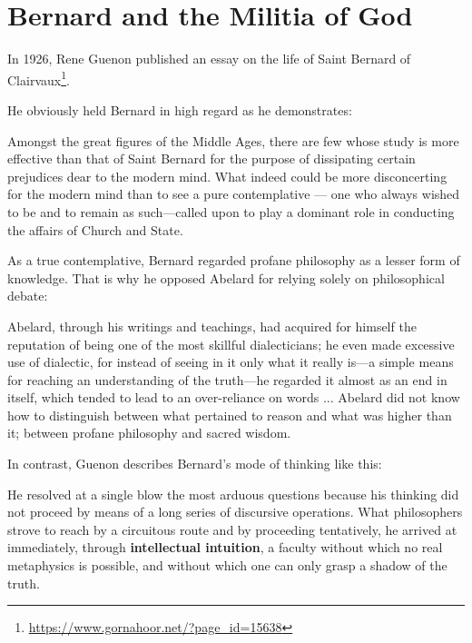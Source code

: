 \section{Bernard and the Militia of God}


\begin{quotex}
In 1926, Rene Guenon published an essay on the life of Saint Bernard of Clairvaux\footnote{\url{https://www.gornahoor.net/?page\_id=15638}}.
\end{quotex}


He obviously held Bernard in high regard as he demonstrates:

\begin{quotex}
Amongst the great figures of the Middle Ages, there are few whose study is more effective than that of Saint Bernard for the purpose of dissipating certain prejudices dear to the modern mind. What indeed could be more disconcerting for the modern mind than to see a pure contemplative --- one who always wished to be and to remain as such---called upon to play a dominant role in conducting the affairs of Church and State.
\end{quotex}


As a true contemplative, Bernard regarded profane philosophy as a lesser form of knowledge. That is why he opposed Abelard for relying solely on philosophical debate:

\begin{quotex}
Abelard, through his writings and teachings, had acquired for himself the reputation of being one of the most skillful dialecticians; he even made excessive use of dialectic, for instead of seeing in it only what it really is---a simple means for reaching an understanding of the truth---he regarded it almost as an end in itself, which tended to lead to an over-reliance on words ... Abelard did not know how to distinguish between what pertained to reason and what was higher than it; between profane philosophy and sacred wisdom.
\end{quotex}


In contrast, Guenon describes Bernard's mode of thinking like this:

\begin{quotex}
He resolved at a single blow the most arduous questions because his thinking did not proceed by means of a long series of discursive operations. What philosophers strove to reach by a circuitous route and by proceeding tentatively, he arrived at immediately, through \textbf{intellectual intuition}, a faculty without which no real metaphysics is possible, and without which one can only grasp a shadow of the truth.
\end{quotex}


